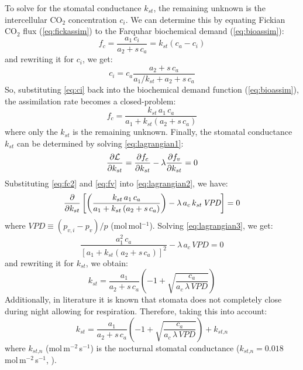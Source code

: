 To solve for the stomatal conductance $k_{st}$, the remaining unknown is the intercellular CO$_2$ concentration $c_i$. We can determine this by equating Fickian CO$_2$ flux (\cref{eq:fickassim}) to the Farquhar biochemical demand (\cref{eq:bioassim}):
\begin{equation}
f_c = \frac{a_1\,c_i}{a_2 + s\,c_a} = k_{st} \left(c_a - c_i\right)
\end{equation}
and rewriting it for $c_i$, we get:
\begin{equation}
c_i = c_a \frac{a_2 + s\,c_a}{a_1/k_{st} + a_2 + s\,c_a}
\label{eq:ci}
\end{equation}
So, substituting \cref{eq:ci} back into the biochemical demand function (\cref{eq:bioassim}), the assimilation rate becomes a closed-problem:
\begin{equation}
f_c = \frac{k_{st}\,a_1\,c_a}{a_1 + k_{st} \left(a_2 + s\,c_a\right)}
\label{eq:fc2}
\end{equation}
where only the $k_{st}$ is the remaining unknown. Finally, the stomatal conductance $k_{\textit{st}}$ can be determined by solving \cref{eq:lagrangian1}:
\begin{equation}
\frac{\partial \mathcal{L}}{\partial k_{st}} = \frac{\partial f_c}{\partial k_{st}} - \lambda \frac{\partial f_v}{\partial k_{st}} = 0
\label{eq:lagrangian2}
\end{equation}
Substituting \cref{eq:fc2} and \cref{eq:fv} into \cref{eq:lagrangian2}, we have:
\begin{equation}
\frac{\partial }{\partial k_{st}} \left[ \left(\frac{k_{st}\, a_1 \,c_a}{a_1 + k_{st} \left(a_2 + s\, c_a\right)}\right)- \lambda\, a_c\, k_{\textit{st}}\, \textit{VPD} \right] = 0
\label{eq:lagrangian3}
\end{equation}
where $\textit{VPD} \equiv \left(p_{v,i} - p_v \right)/p$ (mol\,mol$^{-1}$). Solving \cref{eq:lagrangian3}, we get:
\begin{equation}
\frac{a_1^2\, c_a}{\left[a_1 + k_{st} \left(a_2 + s \,c_a\right)\right]^2}- \lambda\, a_c \,\textit{VPD} = 0
\end{equation}
and rewriting it for $k_{\textit{st}}$, we obtain:
\begin{equation}
k_{\textit{st}} = \frac{a_1}{a_2 + s\,c_a} \left( -1 + \sqrt{\frac{c_a}{a_c\, \lambda \,\textit{VPD}}} \right)
\label{eq:kst}
\end{equation}
Additionally, in literature it is known that stomata does not completely close during night allowing for respiration. Therefore, taking this into account:
\begin{equation}
k_{\textit{st}} = \frac{a_1}{a_2 + s\,c_a} \left( -1 + \sqrt{\frac{c_a}{a_c\, \lambda\, \textit{VPD}}} \right) + k_{\textit{st,n}}
\end{equation}
where $k_{\textit{st,n}}$ (mol\,m$^{-2}$\,s$^{-1}$) is the nocturnal stomatal conductance ($k_{\textit{st,n}} = 0.018$ mol\,m$^{-2}$\,s$^{-1}$, \citep{Manoli2014}). 

